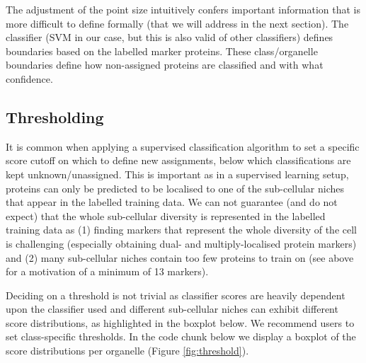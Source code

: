 The adjustment of the point size intuitively confers important
information that is more difficult to define formally (that we
will address in the next section). The classifier (SVM in our case, but
this is also valid of other classifiers) defines boundaries based on
the labelled marker proteins. These class/organelle boundaries define
how non-assigned proteins are classified and with what confidence.

\subsection*{Thresholding}\label{sec:thresholding}

It is common when applying a supervised classification algorithm to
set a specific score cutoff on which to define new assignments, below
which classifications are kept unknown/unassigned. This is important
as in a supervised learning setup, proteins can only be predicted to
be localised to one of the sub-cellular niches that appear in the
labelled training data. We can not guarantee (and do not expect) that
the whole sub-cellular diversity is represented in the labelled
training data as (1) finding markers that represent the whole
diversity of the cell is challenging (especially obtaining dual- and
multiply-localised protein markers) and (2) many sub-cellular niches
contain too few proteins to train on (see above for a motivation of a
minimum of 13 markers).

Deciding on a threshold is not trivial as classifier scores are
heavily dependent upon the classifier used and different sub-cellular
niches can exhibit different score distributions, as highlighted in
the boxplot below. We recommend users to set class-specific
thresholds.  In the code chunk below we display a boxplot of the score
distributions per organelle (Figure \ref{fig:threshold}).

